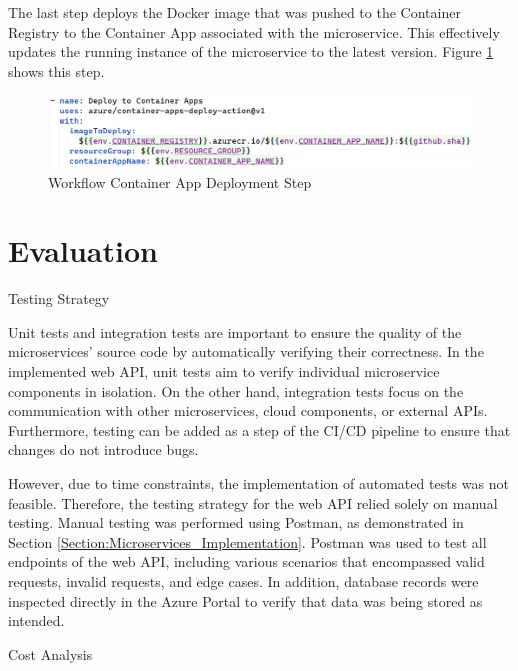 \documentclass[12pt, reqno, oneside]{amsbook}
\makeatletter
\def\section{\@startsection{section}{1}%
      \z@{.5\linespacing\@plus.7\linespacing}{.25\linespacing}%
      {\normalfont\bfseries\flushleft}}
\theoremstyle{definition}
\theoremstyle{definition}
\numberwithin{section}{chapter}
\numberwithin{table}{chapter}
\numberwithin{figure}{chapter}
\makeatother
\begin{document}
The last step deploys the Docker image that was pushed to the Container Registry to the Container App associated with the microservice. This effectively updates the running instance of the microservice to the latest version. Figure \ref{Figure:GithubWorkflowContainerAppDeployment} shows this step.

\begin{figure}[H]
  \centering
  \includegraphics[width=1\linewidth]{images/GithubWorkflowContainerAppDeployment.png}
  \caption{\label{Figure:GithubWorkflowContainerAppDeployment}Workflow Container App Deployment Step}
\end{figure}

\chapter{Evaluation}
\label{Chapter:Evaluation}
\section{Testing Strategy}
\label{Section:Testing_Strategy}

Unit tests and integration tests are important to ensure the quality of the microservices' source code by automatically verifying their correctness. In the implemented web \ac{API}, unit tests aim to verify individual microservice components in isolation. On the other hand, integration tests focus on the communication with other microservices, cloud components, or external \acp{API}. Furthermore, testing can be added as a step of the CI/CD pipeline to ensure that changes do not introduce bugs.

However, due to time constraints, the implementation of automated tests was not feasible. Therefore, the testing strategy for the web \ac{API} relied solely on manual testing. Manual testing was performed using Postman, as demonstrated in Section \ref{Section:Microservices_Implementation}. Postman was used to test all endpoints of the web \ac{API}, including various scenarios that encompassed valid requests, invalid requests, and edge cases. In addition, database records were inspected directly in the Azure Portal to verify that data was being stored as intended.

\section{Cost Analysis}
\label{Section:Cost_Analysis}
\end{document}

